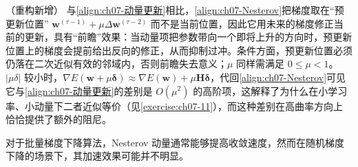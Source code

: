 \documentclass[../../main.tex]{subfiles}
\begin{document}
\begin{remark}（重构新增）
与\eqref{align:ch07-动量更新}相比，\eqref{align:ch07-Nesterov}把梯度取在“预更新位置” $\mathbf{w}^{(\tau-1)}+\mu\Delta\mathbf{w}^{(\tau-2)}$ 而不是当前位置，因此它用未来的梯度修正当前的更新，具有“前瞻”效果：当动量项把参数带向一个即将上升的方向时，预更新位置上的梯度会提前给出反向的修正，从而抑制过冲。条件方面，预更新位置必须仍落在二次近似有效的邻域内，否则前瞻失去意义；$\mu$ 同样需满足 $0\leqslant\mu<1$。$|\mu\delta|$ 较小时，$\nabla E(\mathbf{w}+\mu\boldsymbol{\delta})\approx\nabla E(\mathbf{w})+\mu\mathbf{H}\boldsymbol{\delta}$，代回\eqref{align:ch07-Nesterov}可见它与\eqref{align:ch07-动量更新}的差别是 $O(\mu^{2})$ 的高阶项，这解释了为什么在小学习率、小动量下二者近似等价（见\cref{exercise:ch07-11}），而这种差别在高曲率方向上恰恰提供了额外的阻尼。
\end{remark}

对于批量梯度下降算法，Nesterov 动量通常能够提高收敛速度，然而在随机梯度下降的场景下，其加速效果可能并不明显。
\end{document}
